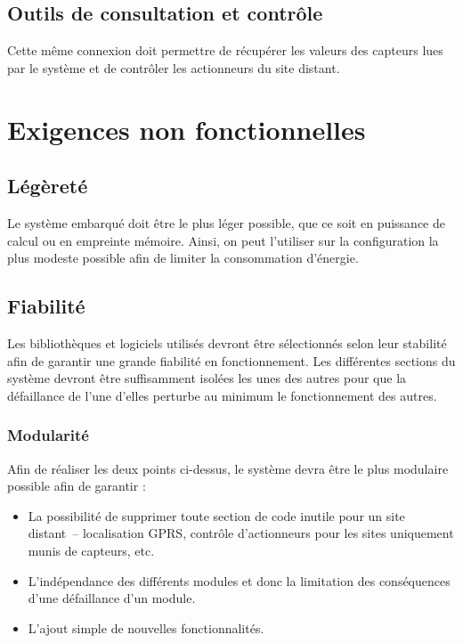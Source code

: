 \documentclass[a4paper, 11pt, final]{article}
\begin{document}
\subsection{Outils de consultation et contrôle}
Cette même connexion doit permettre de récupérer les valeurs des capteurs lues par le système et de contrôler les actionneurs du site distant.
	
	





\section{Exigences non fonctionnelles}

\subsection{Légèreté}
Le système embarqué doit être le plus léger possible, que ce soit en puissance de calcul ou en empreinte mémoire. Ainsi, on peut l'utiliser sur la configuration la plus modeste possible afin de limiter la consommation d'énergie.

\subsection{Fiabilité}
Les bibliothèques et logiciels utilisés devront être sélectionnés selon leur stabilité afin de garantir une grande fiabilité en fonctionnement. Les différentes sections du système devront être suffisamment isolées les unes des autres pour que la défaillance de l'une d'elles perturbe au minimum le fonctionnement des autres.
		
\subsubsection{Modularité}
Afin de réaliser les deux points ci-dessus, le système devra être le plus modulaire possible afin de garantir :
\begin{itemize}
\item La possibilité de supprimer toute section de code inutile pour un site distant~-- localisation GPRS, contrôle d'actionneurs pour les sites uniquement munis de capteurs, etc.
\item L'indépendance des différents modules et donc la limitation des conséquences d'une défaillance d'un module.
\item L'ajout simple de nouvelles fonctionnalités.
\end{itemize}
\end{document}
